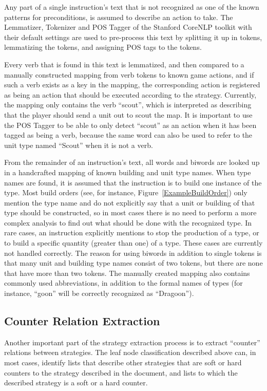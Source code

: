\documentclass[]{article}
\newcommand{\reffigure}[1]{Figure~\ref{#1}}
\begin{document}
Any part of a single instruction's text that is not recognized as one of the known patterns for preconditions, is assumed to describe an action to take. The Lemmatizer, Tokenizer and POS Tagger of the Stanford CoreNLP toolkit \cite{StanfordCoreNLP} with their default settings are used to pre-process this text by splitting it up in tokens, lemmatizing the tokens, and assigning POS tags to the tokens. 

Every verb that is found in this text is lemmatized, and then compared to a manually constructed mapping from verb tokens to known game actions, and if such a verb exists as a key in the mapping, the corresponding action is registered as being an action that should be executed according to the strategy. Currently, the mapping only contains the verb ``scout'', which is interpreted as describing that the player should send a unit out to scout the map. It is important to use the POS Tagger to be able to only detect ``scout'' as an action when it has been tagged as being a verb, because the same word can also be used to refer to the unit type named ``Scout'' when it is not a verb.

From the remainder of an instruction's text, all words and biwords are looked up in a handcrafted mapping of known building and unit type names. When type names are found, it is assumed that the instruction is to build one instance of the type. Most build orders (see, for instance, \reffigure{ExampleBuildOrder}) only mention the type name and do not explicitly say that a unit or building of that type should be constructed, so in most cases there is no need to perform a more complex analysis to find out what should be done with the recognized type. In rare cases, an instruction explicitly mentions to stop the production of a type, or to build a specific quantity (greater than one) of a type. These cases are currently not handled correctly. The reason for using biwords in addition to single tokens is that many unit and building type names consist of two tokens, but there are none that have more than two tokens. The manually created mapping also contains commonly used abbreviations, in addition to the formal names of types (for instance, ``goon'' will be correctly recognized as ``Dragoon'').

\subsection{Counter Relation Extraction}
Another important part of the strategy extraction process is to extract ``counter'' relations between strategies. The leaf node classification described above can, in most cases, identify lists that describe other strategies that are soft or hard counters to the strategy described in the document, and lists to which the described strategy is a soft or a hard counter.
\end{document}
